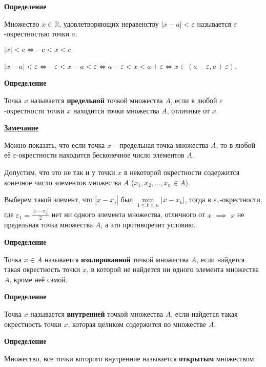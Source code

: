 \documentclass{article}
\newcommand{\parspace}{\vspace{10pt}}
\begin{document}
\textbf{Определение}

Множество $x \in \mathbb{R}$, удовлетворяющих неравенству $|x - a| < \varepsilon$
называется $\varepsilon$-окрестностью точки $a$.

$|x| < c \Leftrightarrow -c < x < c$

$|x - a| < \varepsilon \Leftrightarrow -\varepsilon < x - a < \varepsilon \Leftrightarrow
a - \varepsilon < x < a + \varepsilon \Leftrightarrow x \in (a - \varepsilon, a + \varepsilon)$.

\parspace

\textbf{Определение}

Точка $x$ называется \textbf{предельной} точкой множества $A$, если в любой $\varepsilon$-окрестности
точки $x$ находится точки множества $A$, отличные от $x$.

\parspace

\underline{\textbf{Замечание}}

Можно показать, что если точка $x$ -- предельная точка множества $A$, то в любой её
$\varepsilon$-окрестности находится бесконечное число элементов $A$.

Допустим, что это не так и у точки $x$ в некоторой окрестности содержится конечное
число элементов множества $A$ ($x_1,x_2,\dots,x_n \in A$).

Выберем такой элемент, что $|x - x_j|$ был $\underset{1 \le k \le n}{\min} |x - x_k|$,
тогда в $\varepsilon_1$-окрестности, где $\varepsilon_1 = \frac{|x - x_j|}{2}$ нет ни
одного элемента множества, отличного от $x$ $\implies$ $x$ не предельная точка множества
$A$, а это противоречит условию.

\parspace

\textbf{Определение}

Точка $x \in A$ называется \textbf{изолированной} точкой множества $A$, если найдется такая
окрестность точки $x$, в которой не найдется ни одного элемента множества $A$,
кроме неё самой.

\parspace

\textbf{Определение}

Точка $x$ называется \textbf{внутренней} точкой множества $A$, если найдется такая
окрестность точки $x$, которая целиком содержится во множестве $A$.

\parspace

\textbf{Определение}

Множество, все точки которого внутренние называется \textbf{открытым} множеством.

\parspace
\end{document}
